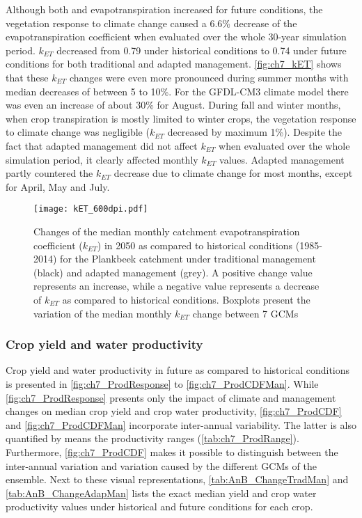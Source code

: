 Although both \ETo and evapotranspiration increased for future conditions, the vegetation response to climate change caused a 6.6\% decrease of the evapotranspiration coefficient when evaluated over the whole 30-year simulation period. $k_{ET}$ decreased from 0.79 under historical conditions to 0.74 under future conditions for both traditional and adapted management. \autoref{fig:ch7_kET} shows that these $k_{ET}$ changes were even more pronounced during summer months with median decreases of between 5 to 10\%. For the GFDL-CM3 climate model there was even an increase of about 30\% for August. During fall and winter months, when crop transpiration is mostly limited to winter crops, the vegetation response to climate change was negligible ($k_{ET}$ decreased by maximum 1\%). Despite the fact that adapted management did not affect $k_{ET}$ when evaluated over the whole simulation period, it clearly affected monthly $k_{ET}$ values. Adapted management partly countered the $k_{ET}$ decrease due to climate change for most months, except for April, May and July.

\begin{figure}[tbhp]
	\centering
		\texttt{[image: kET\_600dpi.pdf]}
	\caption{Changes of the median monthly catchment evapotranspiration coefficient ($k_{ET}$) in 2050 as compared to historical conditions (1985-2014) for the Plankbeek catchment under traditional management (black) and adapted management (grey). A positive change value represents an increase, while a negative value represents a decrease of $k_{ET}$ as compared to historical conditions. Boxplots present the variation of the median monthly $k_{ET}$ change between 7 GCMs}
	\label{fig:ch7_kET}
\end{figure}   

\subsubsection{Crop yield and water productivity}
Crop yield and water productivity in future as compared to historical conditions is presented in \autoref{fig:ch7_ProdResponse} to \autoref{fig:ch7_ProdCDFMan}. While \autoref{fig:ch7_ProdResponse} presents only the impact of climate and management changes on median crop yield and crop water productivity, \autoref{fig:ch7_ProdCDF} and \autoref{fig:ch7_ProdCDFMan} incorporate inter-annual variability. The latter is also quantified by means the productivity ranges (\autoref{tab:ch7_ProdRange}). Furthermore, \autoref{fig:ch7_ProdCDF} makes it possible to distinguish between the inter-annual variation and variation caused by the different GCMs of the ensemble. Next to these visual representations, \autoref{tab:AnB_ChangeTradMan} and \ref{tab:AnB_ChangeAdapMan} lists the exact median yield and crop water productivity values under historical and future conditions for each crop. 

